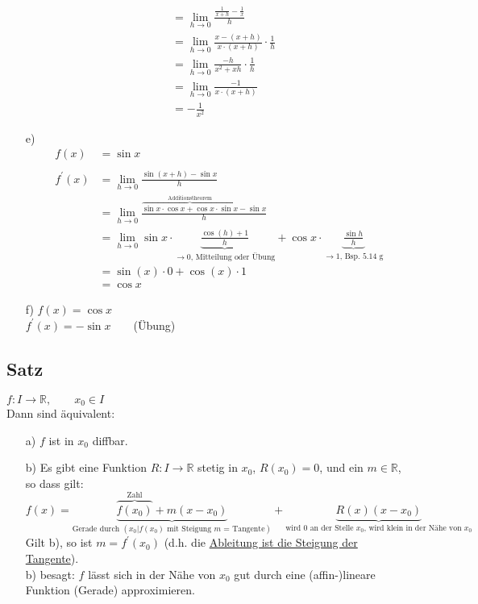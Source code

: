 \documentclass[12pt, titlepage]{article}
\newcommand{\R}{\mathds{R}}
\renewcommand{\>}{\rightarrow}
\renewcommand{\*}{\cdot}
\begin{document}
\begin{itemize}
\begin{align*}
			&=\lim\limits_{h\>0}\frac{\frac{1}{x+h}-\frac{1}{x}}{h}\\
			&=\lim\limits_{h\>0}\frac{x-(x+h)}{x\*(x+h)}\*\frac{1}{h}\\
			&=\lim\limits_{h\>0}\frac{-h}{x^2+xh}\*\frac{1}{h}\\
			&=\lim\limits_{h\>0}\frac{-1}{x\*(x+h)}\\
			&=-\frac{1}{x^2}
		\end{align*}
		\item[e)] \begin{align*}
			f(x)&=\sin x\\
			&\\
			f^\prime(x)&=\lim\limits_{h\>0}\frac{\sin(x+h)-\sin x}{h}\\
			&=\lim\limits_{h\>0}\frac{\overbrace{\sin x\*\cos x+\cos x\*\sin x}^{\textrm{Additionstheorem}}-\sin x}{h}\\
			&=\lim\limits_{h\>0}\sin x\*\underbrace{\frac{\cos (h)+1}{h}}_{\>0\textrm{, Mitteilung oder Übung}}+\cos x\*\underbrace{\frac{\sin h}{h}}_{\>1\textrm{, Bsp. 5.14 g}}\\
			&=\sin (x)\*0+\cos(x)\*1\\
			&=\cos x
		\end{align*}
		\item[f)] $f(x)=\cos x$\\
		$f^\prime(x)=-\sin x\qquad$(Übung)
	\end{itemize}
	\subsection{Satz}
	$f\colon I\>\R,\qquad x_0\in I$\\
	Dann sind äquivalent:
	\begin{itemize}
		\item[a)] $f$ ist in $x_0$ diffbar.
		\item[b)] Es gibt eine Funktion $R\colon I\>\R$ stetig in $x_0$, $R(x_0)=0$, und ein $m\in\R$, so dass gilt:\\
		$f(x)=\underbrace{\overbrace{f(x_0)}^{\textrm{Zahl}}+m(x-x_0)}_{\textrm{Gerade durch }(x_0|f(x_0)\textrm{ mit Steigung }m\textrm{ = Tangente})}+\underbrace{R(x)(x-x_0)}_{\textrm{wird 0 an der Stelle  }x_0\textrm{, wird klein in der Nähe von }x_0}$\\
		Gilt b), so ist $m=f^\prime(x_0)$ (d.h. die \underline{Ableitung ist die Steigung der Tangente}).\\
		b) besagt: $f$ lässt sich in der Nähe von $x_0$ gut durch eine (affin-)lineare Funktion (Gerade) approximieren.	
	\end{itemize}
\end{document}
